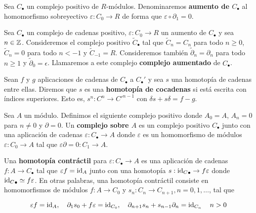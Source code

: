 \begin{definicion}
	Sea $C_{\bullet}$ un complejo positivo de $R$-módulos. Denominaremos \textbf{aumento de $C_{\bullet}$} al homomorfismo sobreyectivo $\varepsilon : C_0 \to R$ de forma que $\varepsilon \circ \partial_1 = 0$.
\end{definicion}

\begin{definicion}
	Sea $C_{\bullet}$ un complejo de cadenas positivo, $\varepsilon : C_0 \to R$ un aumento de $C_{\bullet}$ y sea $n \in \mathbb{Z}$. Consideremos el complejo positivo $\widetilde{C}_{\bullet}$ tal que $\widetilde{C}_n = C_n$ para todo $n \geq 0$, $\widetilde{C}_n = 0$ para todo $n < -1$ y $\widetilde{C}_{-1}=R$. Consideremos también $\widetilde{\partial}_n = \partial_n$ para todo $n \geq 1$ y $\widetilde{\partial}_0= \epsilon$. Llamaremos a este complejo \textbf{complejo aumentado} de $C_{\bullet}$.
\end{definicion}

\begin{definicion}
Sean $f$ y $g$ aplicaciones de cadenas de $C_{\bullet}$ a $C_{\bullet}'$ y sea $s$ una homotopía de cadenas entre ellas. Diremos que $s$ es una \textbf{homotopía de cocadenas} si  está escrita con índices superiores. Esto es, \( s^n: C^n \to C'^{n-1} \) con \( \delta s + s \delta = f - g \).
\end{definicion}

\begin{definicion}
	Sea $A$ un módulo. Definimos el siguiente complejo positivo donde \( A_0 = A \), \( A_n = 0 \) para \( n \neq 0 \) y \( \partial = 0 \). Un \textbf{complejo sobre \( A \)} es un complejo positivo \( C_{\bullet} \) junto con una aplicación de cadenas \( \varepsilon: C_{\bullet} \to A \) donde \( \varepsilon \) es un homomorfismo de módulos \( \varepsilon: C_0 \to A \) tal que \( \varepsilon \partial = 0: C_1 \to A \).
\end{definicion}

\begin{definicion}
\label{def:contr_homotopy}
Una \textbf{homotopía contráctil} para \( \varepsilon: C_{\bullet} \to A \) es una aplicación de cadenas \( f: A \to C_{\bullet} \) tal que \( \varepsilon f = \operatorname{id}_A \) junto con una homotopía \( s: {\operatorname{id}_C}_{\bullet} \rightarrow f \varepsilon \) donde \( {\operatorname{id}_C}_{\bullet} \simeq f \varepsilon \). En otras palabras, una homotopía contráctil consiste en homomorfismos de módulos \( f: A \to C_0 \) y \( s_n: C_n \to C_{n+1}, n = 0, 1, \dots \), tal que

\[ \varepsilon f = \operatorname{id}_A, \quad \partial_{1} s_0 + f \varepsilon = \operatorname{id}_{C_0}, \quad \partial_{n+1} s_n + s_{n-1} \partial_n = \operatorname{id}_{C_n} \quad n > 0 \]
\end{definicion}


